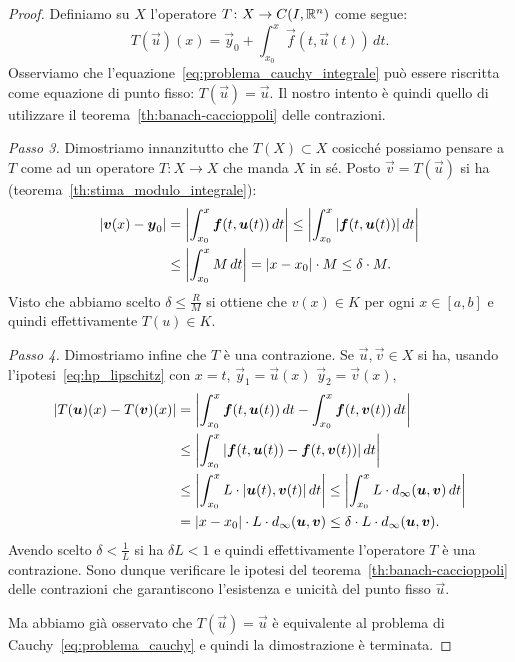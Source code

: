 \begin{proof}
  Definiamo su $X$ l'operatore $T\colon X \to C(I,{\mathbb R}^n)$ come segue:
  \[
    T(\vec u)(x) = \vec y_0 + \int_{x_0}^x \vec f(t,\vec u(t))\, dt.
  \]
  Osserviamo che l'equazione~\eqref{eq:problema_cauchy_integrale} può essere riscritta
  come equazione di punto fisso: $T(\vec u) = \vec u$. 
  Il nostro intento è quindi quello di utilizzare il teorema~\ref{th:banach-caccioppoli} delle contrazioni.

  \emph{Passo 3.}
  Dimostriamo innanzitutto che $T(X)\subset X$ cosicché possiamo pensare a $T$ come ad un operatore 
  $T\colon X\to X$ che manda $X$ in sé.
  Posto $\vec v = T(\vec u)$ si ha
  (teorema~\ref{th:stima_modulo_integrale}):
  \begin{align*}
    {\left|\boldsymbol v(x)-\boldsymbol y_0\right|} 
    &= {\left|\int_{x_0}^x \boldsymbol f(t, \boldsymbol u(t))\, dt\right|} 
    \le {\left|\int_{x_0}^x {\left|\boldsymbol f(t,\boldsymbol u(t))\right|}\, dt\right|}\\
    &\le {\left|\int_{x_0}^x M\, dt \right|} 
    = {\left|x-x_0\right|}\cdot M \le \delta \cdot M.
  \end{align*}
Visto che abbiamo scelto $\delta \le \frac{R}{M}$ si ottiene che $v(x) \in K$ per ogni $x\in [a,b]$ 
e quindi effettivamente $T(u)\in K$.

\emph{Passo 4.}
Dimostriamo infine che $T$ è una contrazione. 
Se $\vec u,\vec v\in X$ si ha, usando l'ipotesi~\eqref{eq:hp_lipschitz} con $x=t$, $\vec y_1=\vec u(x)$
$\vec y_2 = \vec v(x)$,
\begin{align*}
{\left|T(\boldsymbol u)(x)-T(\boldsymbol v)(x)\right|} 
  &= {\left|\int_{x_0}^x \boldsymbol f(t,\boldsymbol u(t))\, dt - \int_{x_0}^x \boldsymbol f(t,\boldsymbol v(t))\, dt\right|} \\
  &\le {\left|\int_{x_0}^x {\left|\boldsymbol f(t,\boldsymbol u(t))- \boldsymbol f(t,\boldsymbol v(t))\right|}\, dt \right|}\\
  &\le {\left|\int_{x_0}^x L\cdot  {\left|\boldsymbol u(t), \boldsymbol v(t)\right|}\, dt\right|} 
  \le {\left|\int_{x_0}^x L \cdot d_\infty(\boldsymbol u, \boldsymbol v)\, dt\right|}  \\
  &={\left|x-x_0\right|}\cdot L \cdot d_\infty(\boldsymbol u,\boldsymbol v)
  \le \delta \cdot L \cdot d_\infty(\boldsymbol u,\boldsymbol v).
\end{align*}
Avendo scelto $\delta < \frac{1}{L}$ si ha $\delta L<1$ e quindi effettivamente l'operatore $T$ 
è una contrazione.
Sono dunque verificare le ipotesi del teorema~\ref{th:banach-caccioppoli} delle contrazioni
che garantiscono l'esistenza e unicità del punto fisso $\vec u$.

Ma abbiamo già osservato che $T(\vec u) = \vec u$ è equivalente al problema di Cauchy~\eqref{eq:problema_cauchy}
e quindi la dimostrazione è terminata.
\end{proof}

